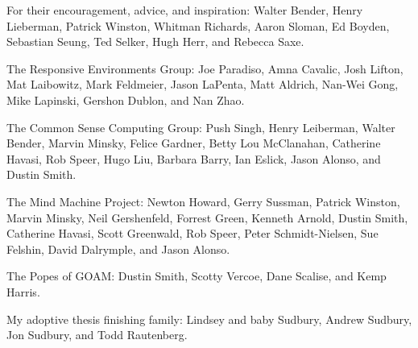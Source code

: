 \vspace{5mm}

\noindent For their encouragement, advice, and inspiration:
Walter Bender,
Henry Lieberman,
Patrick Winston,
Whitman Richards,
Aaron Sloman,
Ed Boyden,
Sebastian Seung,
Ted Selker,
Hugh Herr, and
Rebecca Saxe.

\vspace{5mm}

\noindent The Responsive Environments Group:
Joe Paradiso,
Amna Cavalic,
Josh Lifton, %
Mat Laibowitz, %
Mark Feldmeier, %
Jason LaPenta,
Matt Aldrich, %
Nan-Wei Gong, %
Mike Lapinski, %
Gershon Dublon,
and Nan Zhao. %

\vspace{5mm}

\noindent The Common Sense Computing Group:
Push Singh,
Henry Leiberman,
Walter Bender,
Marvin Minsky,
Felice Gardner,
Betty Lou McClanahan,
Catherine Havasi,
Rob Speer,
Hugo Liu,
Barbara Barry,
Ian Eslick,
Jason Alonso, and
Dustin Smith.

\vspace{5mm}

\noindent The Mind Machine Project:
Newton Howard, Gerry Sussman, Patrick Winston, Marvin Minsky, Neil Gershenfeld, Forrest Green, Kenneth Arnold, Dustin Smith, Catherine Havasi, Scott Greenwald, Rob Speer, Peter Schmidt-Nielsen, Sue Felshin, David Dalrymple, and Jason Alonso.

\vspace{5mm}

\noindent The Popes of GOAM:
Dustin Smith,
Scotty Vercoe,
Dane Scalise, and
Kemp Harris.

\vspace{5mm}

\noindent My adoptive thesis finishing family:
Lindsey and baby Sudbury, Andrew Sudbury, Jon Sudbury, and Todd Rautenberg.

\vspace{5mm}

